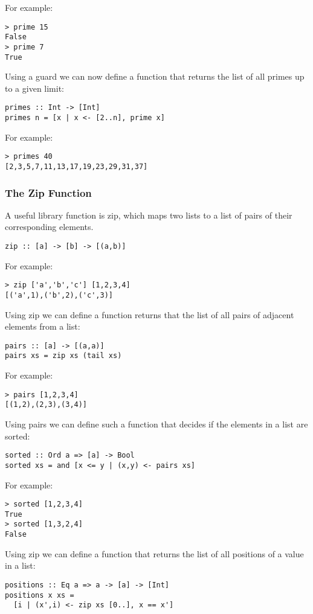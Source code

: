 \begin{multicols}{2}
For example:
\begin{lstlisting}
> prime 15
False
> prime 7
True
\end{lstlisting}

Using a guard we can now define a function that returns the list of all primes up to a given limit:
\begin{lstlisting}
primes :: Int -> [Int]
primes n = [x | x <- [2..n], prime x]
\end{lstlisting}

For example:
\begin{lstlisting}
> primes 40
[2,3,5,7,11,13,17,19,23,29,31,37]
\end{lstlisting}

\subsubsection{The Zip Function}
A useful library function is zip, which maps two lists to a list of pairs of their corresponding elements.
\begin{lstlisting}
zip :: [a] -> [b] -> [(a,b)]
\end{lstlisting}

For example:
\begin{lstlisting}
> zip ['a','b','c'] [1,2,3,4]
[('a',1),('b',2),('c',3)]
\end{lstlisting}

Using zip we can define a function returns that the list of all pairs of adjacent elements from a list:
\begin{lstlisting}
pairs :: [a] -> [(a,a)]
pairs xs = zip xs (tail xs)
\end{lstlisting}

For example:
\begin{lstlisting}
> pairs [1,2,3,4]
[(1,2),(2,3),(3,4)]
\end{lstlisting}

Using pairs we can define such a function that decides if the elements in a list are sorted:
\begin{lstlisting}
sorted :: Ord a => [a] -> Bool
sorted xs = and [x <= y | (x,y) <- pairs xs]
\end{lstlisting}

For example:
\begin{lstlisting}
> sorted [1,2,3,4]
True
> sorted [1,3,2,4]
False
\end{lstlisting}

Using zip we can define a function that returns the list of all positions of a value in a list:
\begin{lstlisting}
positions :: Eq a => a -> [a] -> [Int]
positions x xs = 
  [i | (x',i) <- zip xs [0..], x == x']
\end{lstlisting}


\end{multicols}
